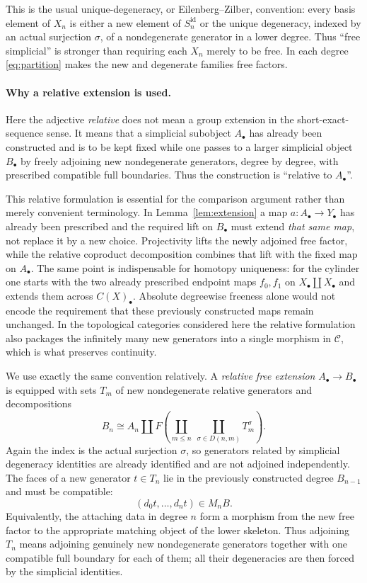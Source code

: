 \documentclass[10pt,a4paper]{amsart}
\newcommand{\C}{\mathcal C}
\newcommand{\id}{\operatorname{id}}
\begin{document}
This is the usual unique-degeneracy, or Eilenberg--Zilber, convention:
every basis element of $X_n$ is either a new element of $S_n^{\id}$ or
the unique degeneracy, indexed by an actual surjection $\sigma$, of a
nondegenerate generator in a lower degree. Thus ``free simplicial'' is
stronger than requiring each $X_n$ merely to be free. In each degree
\eqref{eq:partition} makes the new and degenerate families free factors.

\paragraph{Why a relative extension is used.}
Here the adjective \emph{relative} does not mean a group extension in the
short-exact-sequence sense.  It means that a simplicial subobject
$A_\bullet$ has already been constructed and is to be kept fixed while one
passes to a larger simplicial object $B_\bullet$ by freely adjoining new
nondegenerate generators, degree by degree, with prescribed compatible
full boundaries.  Thus the construction is ``relative to $A_\bullet$''.

This relative formulation is essential for the comparison argument rather
than merely convenient terminology.  In Lemma~\ref{lem:extension} a map
$a:A_\bullet\to Y_\bullet$ has already been prescribed and the required
lift on $B_\bullet$ must extend \emph{that same map}, not replace it by a
new choice.  Projectivity lifts the newly adjoined free factor, while the
relative coproduct decomposition combines that lift with the fixed map on
$A_\bullet$.  The same point is indispensable for homotopy uniqueness:
for the cylinder one starts with the two already prescribed endpoint maps
$f_0,f_1$ on $X_\bullet\amalg X_\bullet$ and extends them across
$C(X)_\bullet$.  Absolute degreewise freeness alone would not encode the
requirement that these previously constructed maps remain unchanged.  In
the topological categories considered here the relative formulation also
packages the infinitely many new generators into a single morphism in
$\C$, which is what preserves continuity.

We use exactly the same convention relatively. A \emph{relative free
extension} $A_\bullet\to B_\bullet$ is equipped with sets $T_m$ of new
nondegenerate relative generators and decompositions
\[
 B_n\cong A_n\amalg
 F\left(\coprod_{m\leq n}\ \coprod_{\sigma\in D(n,m)}T_m^\sigma\right).
\]
Again the index is the actual surjection $\sigma$, so generators related
by simplicial degeneracy identities are already identified and are not
adjoined independently. The faces of a new generator $t\in T_n$ lie in
the previously constructed degree $B_{n-1}$ and must be compatible:
\[
 (d_0t,\ldots,d_nt)\in M_nB.
\]
Equivalently, the attaching data in degree $n$ form a morphism from the
new free factor to the appropriate matching object of the lower
skeleton. Thus adjoining $T_n$ means adjoining genuinely new
nondegenerate generators together with one compatible full boundary for
each of them; all their degeneracies are then forced by the simplicial
identities.
\end{document}
